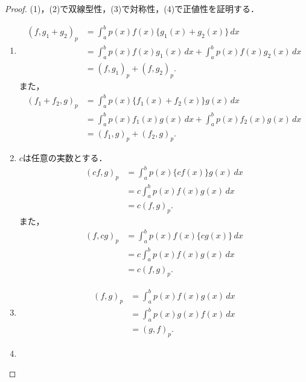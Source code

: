\documentclass[a4paper,10pt,fleqn]{ltjsarticle}
\begin{document}
\begin{tleftbar}
  \begin{proof}
    (1)，(2)で双線型性，(3)で対称性，(4)で正値性を証明する．
    \begin{enumerate}[(1)]
      \item
            \begin{align*}
              (f,g_1+g_2)_p & = \int_{a}^{b} p(x) f(x) \{ g_1(x)+g_2(x) \} \, dx                           \\
                            & = \int_{a}^{b} p(x) f(x) g_1 (x) \, dx + \int_{a}^{b} p(x) f(x) g_2(x) \, dx \\
                            & = (f,g_1)_p + (f,g_2)_p.
            \end{align*}
            また，
            \begin{align*} (f_1 + f_2 , g)_p & = \int_{a}^{b} p(x) \{ f_1(x)+f_2(x) \} g(x) \, dx                            \\
                                 & = \int_{a}^{b} p(x) f_1 (x) g(x) \, dx + \int_{a}^{b} p(x) f_2 (x) g(x) \, dx \\
                                 & = (f_1,g)_p + (f_2,g)_p.
            \end{align*}
      \item $c$は任意の実数とする．
            \begin{align*}
              (cf,g)_p & = \int_{a}^{b} p(x) \{ cf(x) \} g(x) \, dx \\
                       & = c \int_{a}^{b} p(x) f(x) g(x) \, dx      \\
                       & = c(f,g)_p .
            \end{align*}
            また，
            \begin{align*}
              (f,cg)_p & = \int_{a}^{b} p(x) f(x) \{ cg(x) \} \, dx \\
                       & = c \int_{a}^{b} p(x) f(x) g(x) \, dx      \\
                       & = c(f,g)_p .
            \end{align*}
      \item
            \begin{align*}
              (f,g)_p & = \int_{a}^{b} p(x) f(x) g(x) \, dx \\
                      & = \int_{a}^{b} p(x) g(x) f(x) \, dx \\
                      & =(g,f)_p .
            \end{align*}
      \item

\end{enumerate}
\end{proof}
\end{tleftbar}
\end{document}
